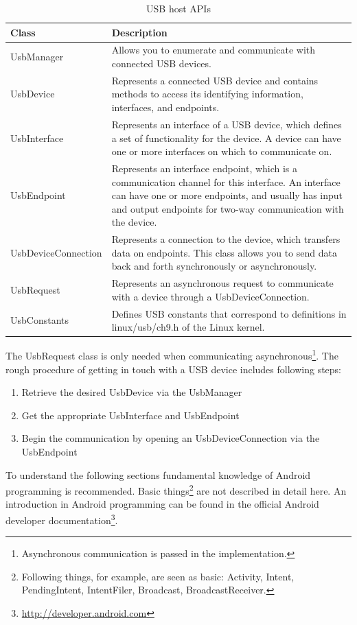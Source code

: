 \begin{table}[ht]
\caption{USB host APIs \cite{android_usb_host}}
\centering
\begin{tabular}{|l|p{10cm}|}
\hline\hline
\textbf{Class} & \textbf{Description} \\ \hline
UsbManager & Allows you to enumerate and communicate with connected USB devices. \\ \hline
UsbDevice & Represents a connected USB device and contains methods to access its identifying information, interfaces, and endpoints. \\ \hline
UsbInterface & Represents an interface of a USB device, which defines a set of functionality for the device. A device can have one or more interfaces on which to communicate on. \\ \hline
UsbEndpoint & Represents an interface endpoint, which is a communication channel for this interface. An interface can have one or more endpoints, and usually has input and output endpoints for two-way communication with the device. \\ \hline
UsbDeviceConnection & Represents a connection to the device, which transfers data on endpoints. This class allows you to send data back and forth synchronously or asynchronously. \\ \hline
UsbRequest & Represents an asynchronous request to communicate with a device through a UsbDeviceConnection. \\ \hline
UsbConstants & Defines USB constants that correspond to definitions in linux/usb/ch9.h of the Linux kernel. \\ \hline
\end{tabular}
\label{table:host_api}
\end{table}

The UsbRequest class is only needed when communicating asynchronous\footnote{Asynchronous communication is passed in the implementation.}. The rough procedure of getting in touch with a USB device includes following steps:

\begin{enumerate}
\item Retrieve the desired UsbDevice via the UsbManager
\item Get the appropriate UsbInterface and UsbEndpoint
\item Begin the communication by opening an UsbDeviceConnection via the UsbEndpoint
\end{enumerate}

To understand the following sections fundamental knowledge of Android programming is recommended. Basic things\footnote{Following things, for example, are seen as basic: Activity, Intent, PendingIntent, IntentFiler, Broadcast, BroadcastReceiver.} are not described in detail here. An introduction in Android programming can be found in the official Android developer documentation\footnote{\url{http://developer.android.com}}.

